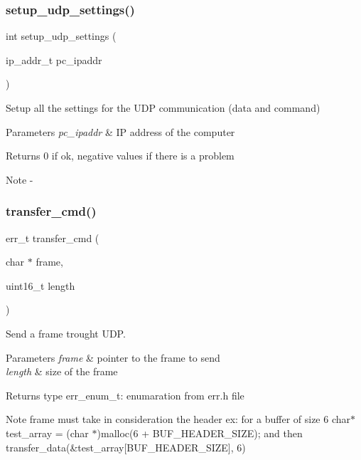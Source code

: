 \subsubsection{setup\_udp\_settings()}
{\footnotesize\ttfamily int setup\+\_\+udp\+\_\+settings (\begin{DoxyParamCaption}\item[{ip\+\_\+addr\+\_\+t}]{pc\+\_\+ipaddr }\end{DoxyParamCaption})}



Setup all the settings for the U\+DP communication (data and command) 


\begin{DoxyParams}{Parameters}
{\em pc\+\_\+ipaddr} & IP address of the computer\\
\hline
\end{DoxyParams}
\begin{DoxyReturn}{Returns}
0 if ok, negative values if there is a problem
\end{DoxyReturn}
\begin{DoxyNote}{Note}
-\/ 
\end{DoxyNote}
\mbox{\label{udp__peripheral_8c_a4adcaacf2585294540f0c7bcad70d11f}} 
\subsubsection{transfer\_cmd()}
{\footnotesize\ttfamily err\+\_\+t transfer\+\_\+cmd (\begin{DoxyParamCaption}\item[{char $\ast$}]{frame,  }\item[{uint16\+\_\+t}]{length }\end{DoxyParamCaption})}



Send a frame trought U\+DP. 


\begin{DoxyParams}{Parameters}
{\em frame} & pointer to the frame to send \\
\hline
{\em length} & size of the frame\\
\hline
\end{DoxyParams}
\begin{DoxyReturn}{Returns}
type err\+\_\+enum\+\_\+t\+: enumaration from err.\+h file
\end{DoxyReturn}
\begin{DoxyNote}{Note}
frame must take in consideration the header ex\+: for a buffer of size 6 char$\ast$ test\+\_\+array = (char $\ast$)malloc(6 + B\+U\+F\+\_\+\+H\+E\+A\+D\+E\+R\+\_\+\+S\+I\+ZE); and then transfer\+\_\+data(\&test\+\_\+array[\+B\+U\+F\+\_\+\+H\+E\+A\+D\+E\+R\+\_\+\+S\+I\+Z\+E], 6) 
\end{DoxyNote}
\mbox{\label{udp__peripheral_8c_afc63b6b60c2621e2e57dc85d49adf824}} 
